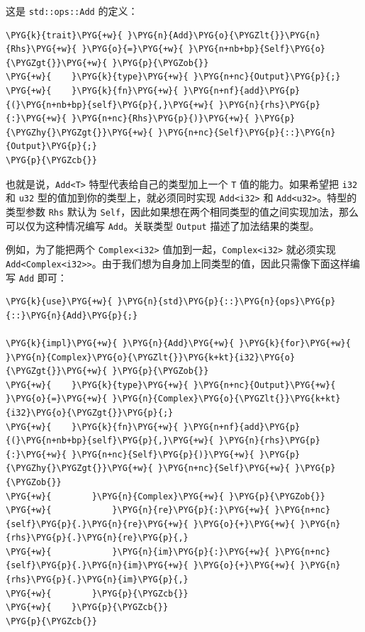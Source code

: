 这是 \texttt{std::ops::Add} 的定义：

\begin{Verbatim}[commandchars=\\\{\},breaklines=true,breakanywhere=true,fontsize=\codefont,xleftmargin=17bp]
\PYG{k}{trait}\PYG{+w}{ }\PYG{n}{Add}\PYG{o}{\PYGZlt{}}\PYG{n}{Rhs}\PYG{+w}{ }\PYG{o}{=}\PYG{+w}{ }\PYG{n+nb+bp}{Self}\PYG{o}{\PYGZgt{}}\PYG{+w}{ }\PYG{p}{\PYGZob{}}
\PYG{+w}{    }\PYG{k}{type}\PYG{+w}{ }\PYG{n+nc}{Output}\PYG{p}{;}
\PYG{+w}{    }\PYG{k}{fn}\PYG{+w}{ }\PYG{n+nf}{add}\PYG{p}{(}\PYG{n+nb+bp}{self}\PYG{p}{,}\PYG{+w}{ }\PYG{n}{rhs}\PYG{p}{:}\PYG{+w}{ }\PYG{n+nc}{Rhs}\PYG{p}{)}\PYG{+w}{ }\PYG{p}{\PYGZhy{}\PYGZgt{}}\PYG{+w}{ }\PYG{n+nc}{Self}\PYG{p}{::}\PYG{n}{Output}\PYG{p}{;}
\PYG{p}{\PYGZcb{}}
\end{Verbatim}

也就是说，\texttt{Add<T>} 特型代表给自己的类型加上一个 \texttt{T} 值的能力。如果希望把 \texttt{i32} 和 \texttt{u32} 型的值加到你的类型上，就必须同时实现 \texttt{Add<i32>} 和 \texttt{Add<u32>}。特型的类型参数 \texttt{Rhs} 默认为 \texttt{Self}，因此如果想在两个相同类型的值之间实现加法，那么可以仅为这种情况编写 \texttt{Add}。关联类型 \texttt{Output} 描述了加法结果的类型。

例如，为了能把两个 \texttt{Complex<i32>} 值加到一起，\texttt{Complex<i32>} 就必须实现 \texttt{Add<Complex<i32>>}。由于我们想为自身加上同类型的值，因此只需像下面这样编写 \texttt{Add} 即可：

\begin{Verbatim}[commandchars=\\\{\},breaklines=true,breakanywhere=true,fontsize=\codefont,xleftmargin=17bp]
\PYG{k}{use}\PYG{+w}{ }\PYG{n}{std}\PYG{p}{::}\PYG{n}{ops}\PYG{p}{::}\PYG{n}{Add}\PYG{p}{;}

\PYG{k}{impl}\PYG{+w}{ }\PYG{n}{Add}\PYG{+w}{ }\PYG{k}{for}\PYG{+w}{ }\PYG{n}{Complex}\PYG{o}{\PYGZlt{}}\PYG{k+kt}{i32}\PYG{o}{\PYGZgt{}}\PYG{+w}{ }\PYG{p}{\PYGZob{}}
\PYG{+w}{    }\PYG{k}{type}\PYG{+w}{ }\PYG{n+nc}{Output}\PYG{+w}{ }\PYG{o}{=}\PYG{+w}{ }\PYG{n}{Complex}\PYG{o}{\PYGZlt{}}\PYG{k+kt}{i32}\PYG{o}{\PYGZgt{}}\PYG{p}{;}
\PYG{+w}{    }\PYG{k}{fn}\PYG{+w}{ }\PYG{n+nf}{add}\PYG{p}{(}\PYG{n+nb+bp}{self}\PYG{p}{,}\PYG{+w}{ }\PYG{n}{rhs}\PYG{p}{:}\PYG{+w}{ }\PYG{n+nc}{Self}\PYG{p}{)}\PYG{+w}{ }\PYG{p}{\PYGZhy{}\PYGZgt{}}\PYG{+w}{ }\PYG{n+nc}{Self}\PYG{+w}{ }\PYG{p}{\PYGZob{}}
\PYG{+w}{        }\PYG{n}{Complex}\PYG{+w}{ }\PYG{p}{\PYGZob{}}
\PYG{+w}{            }\PYG{n}{re}\PYG{p}{:}\PYG{+w}{ }\PYG{n+nc}{self}\PYG{p}{.}\PYG{n}{re}\PYG{+w}{ }\PYG{o}{+}\PYG{+w}{ }\PYG{n}{rhs}\PYG{p}{.}\PYG{n}{re}\PYG{p}{,}
\PYG{+w}{            }\PYG{n}{im}\PYG{p}{:}\PYG{+w}{ }\PYG{n+nc}{self}\PYG{p}{.}\PYG{n}{im}\PYG{+w}{ }\PYG{o}{+}\PYG{+w}{ }\PYG{n}{rhs}\PYG{p}{.}\PYG{n}{im}\PYG{p}{,}
\PYG{+w}{        }\PYG{p}{\PYGZcb{}}
\PYG{+w}{    }\PYG{p}{\PYGZcb{}}
\PYG{p}{\PYGZcb{}}
\end{Verbatim}

